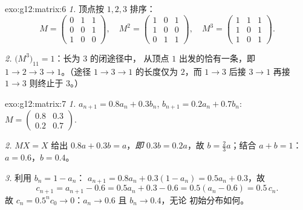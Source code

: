 \begin{solution}{exo:g12:matrix:6}
\emph{1.} 顶点按 $1, 2, 3$ 排序：
\[
M = \begin{pmatrix} 0&1&1\\ 0&0&1\\ 1&0&0\end{pmatrix}, \quad
M^2 = \begin{pmatrix} 1&0&1\\ 1&0&0\\ 0&1&1\end{pmatrix}, \quad
M^3 = \begin{pmatrix} 1&1&1\\ 1&0&1\\ 1&0&1 \end{pmatrix}.
\]

\emph{2.} $\bigl(M^3\bigr)_{11} = 1$：长为 $3$ 的闭途径中，
从顶点 $1$ 出发的恰有一条，即 $1 \to 2 \to 3 \to 1$。（途径
$1 \to 3 \to 1$ 的长度仅为 $2$，而 $1 \to 3$ 后接 $3\to1$ 再接
$1\to3$ 则终止于 $3$。）
\end{solution}

\begin{solution}{exo:g12:matrix:7}
\emph{1.} $a_{n+1} = 0.8a_n + 0.3b_n$, $b_{n+1} = 0.2a_n + 0.7b_n$:
$M = \begin{pmatrix} 0.8 & 0.3\\ 0.2 & 0.7\end{pmatrix}$.

\emph{2.} $MX = X$ 给出 $0.8a + 0.3b = a$，\emph{即} $0.3b = 0.2a$，故
$b = \frac23 a$；结合 $a + b = 1$：$a = 0.6$，$b = 0.4$。

\emph{3.} 利用 $b_n = 1 - a_n$：
$a_{n+1} = 0.8a_n + 0.3(1 - a_n) = 0.5a_n + 0.3$，故
\[
c_{n+1} = a_{n+1} - 0.6 = 0.5a_n + 0.3 - 0.6 = 0.5(a_n - 0.6) = 0.5\,c_n .
\]
故 $c_n = 0.5^n c_0 \to 0$：$a_n \to 0.6$ 且 $b_n \to 0.4$，无论
初始分布如何。
\end{solution}

